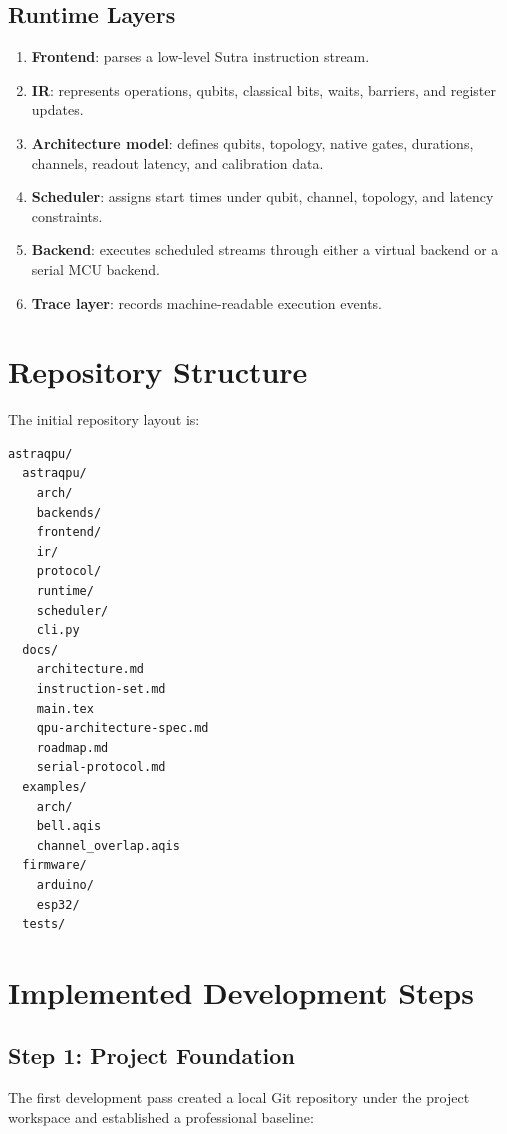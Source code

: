 \documentclass[11pt,a4paper]{article}
\begin{document}
\subsection{Runtime Layers}

\begin{enumerate}[leftmargin=*]
  \item \textbf{Frontend}: parses a low-level Sutra instruction stream.
  \item \textbf{IR}: represents operations, qubits, classical bits, waits, barriers, and register updates.
  \item \textbf{Architecture model}: defines qubits, topology, native gates, durations, channels, readout latency, and calibration data.
  \item \textbf{Scheduler}: assigns start times under qubit, channel, topology, and latency constraints.
  \item \textbf{Backend}: executes scheduled streams through either a virtual backend or a serial MCU backend.
  \item \textbf{Trace layer}: records machine-readable execution events.
\end{enumerate}

\section{Repository Structure}

The initial repository layout is:

\begin{lstlisting}[style=astra]
astraqpu/
  astraqpu/
    arch/
    backends/
    frontend/
    ir/
    protocol/
    runtime/
    scheduler/
    cli.py
  docs/
    architecture.md
    instruction-set.md
    main.tex
    qpu-architecture-spec.md
    roadmap.md
    serial-protocol.md
  examples/
    arch/
    bell.aqis
    channel_overlap.aqis
  firmware/
    arduino/
    esp32/
  tests/
\end{lstlisting}

\section{Implemented Development Steps}

\subsection{Step 1: Project Foundation}

The first development pass created a local Git repository under the project workspace and established a professional baseline:
\end{document}
